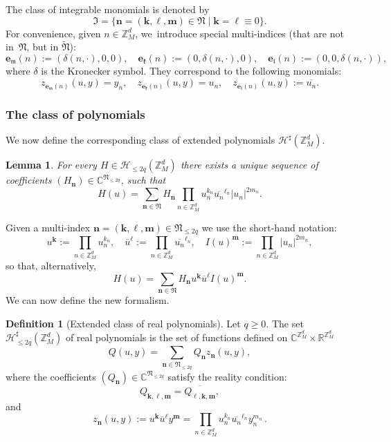 \documentclass[JEP,XML,SOM,Unicode,published]{cedram}
\theoremstyle{plain}
\newtheorem{lemma}[theorem]{Lemma}
\theoremstyle{definition}
\newtheorem{definition}[theorem]{Definition}
\newcommand{\nb}{{\boldsymbol n}}
\newcommand{\kb}{{\boldsymbol k}}
\newcommand{\lb}{{\boldsymbol \ell}}
\newcommand{\mb}{{\boldsymbol m}}
\newcommand{\Nb}{{\boldsymbol{\mathfrak{N}}}}
\newcommand{\Z}{\mathbb{Z}}
\newcommand{\R}{\mathbb{R}}
\newcommand{\C}{\mathbb{C}}
\newcommand{\1}{\mathbf{1}}
\begin{document}
The class of integrable monomials is denoted by
\begin{equation}
\label{eq:I}
\mathfrak{I} = \{\nb=(\kb,\lb,\mb)\in\Nb\mid \kb=\lb\equiv0\}.
\end{equation}
For convenience, given $n\in\Z_{M}^{d}$, we~introduce special multi-indices (that are not in~$\Nb$, but in $\widetilde{\Nb}$):
\[
\boldsymbol{e}_{\mathfrak{m}}(n) := (\delta(n,\cdot),0,0),\quad \boldsymbol{e}_{\mathfrak{k}}(n):=(0,\delta(n, \cdot),0),\quad \boldsymbol{e}_{\mathfrak{l}}(n) := (0,0,\delta(n,\cdot)),
\]
where $\delta$ is the Kronecker symbol. They correspond to the following monomials:
\[
z_{\boldsymbol{e}_{\mathfrak{m}}(n)}(u,y) = y_{n},
\quad z_{\boldsymbol{e}_{\mathfrak{k}}(n)}(u,y) = u_{n},
\quad z_{\boldsymbol{e}_{\mathfrak{l}}(n)}(u,y) := \overline{u_{n}}.
\]

\subsubsection{The class of polynomials} We now define the corresponding class of extended polynomials $\mathcal{H}^{\sharp}(\Z_{M}^{d})$.

\begin{lemma} \label{lem:pouette}
For every $H\in\mathcal{H}_{\leq 2q}(\Z_{M}^{d})$ there exists a unique sequence of coefficients $(H_{\nb})\in\C^{\Nb_{\leq2q}}$, such that
\[
H(u) = \sum_{\nb\in\Nb} H_{\nb}
\prod_{n\in\Z_{M}^{d}}
u_{n}^{k_{n}}\overline{u_{n}}^{\ell_{n}}|u_{n}|^{2m_{n}}.
\]
\end{lemma}
Given a multi-index $\nb=(\kb,\lb,\mb)\in\Nb_{\leq2q}$ we use the short-hand notation:
\[
u^{\kb}
:= \prod_{n\in\Z_{M}^{d}}u_{n}^{k_{n}},
\quad
\overline{u}^{\lb}
:= \prod_{n\in\Z_{M}^{d}}\overline{u_{n}}^{\ell_{n}},\quad
I(u)^{\mb}
:= \prod_{n\in\Z_{M}^{d}}|u_{n}|^{2m_{n}},
\]
so that, alternatively,
\[
H(u) = \sum_{\nb\in\Nb} H_{\nb}u^{\kb}\overline{u}^{\lb}I(u)^{\mb}.
\]
We can now define the new formalism.
\begin{definition}[Extended class of real polynomials]
\label{def:ext} Let $q\geq0$. The set $\mathcal{H}^{\sharp}_{\leq2q}(\Z_{M}^{d})$ of real polynomials is the set of functions defined on $\C^{\Z_{M}^{d}}\times\R^{\Z_{M}^{d}}$
\[
Q(u,y) = \sum_{\nb\in\Nb_{\leq2q}} Q_{\nb}z_{\nb}(u,y),
\]
where the coefficients $(Q_{\nb})\in\C^{\Nb_{\leq2q}}$ satisfy the reality condition:
\[
Q_{\kb,\lb,\mb}= \overline{Q_{\lb,\kb,\mb}},
\]
and
\[
z_{\nb}(u,y) := u^{\kb}\overline{u}^{\lb}y^{\mb} = \prod_{n\in\Z_{M}^{d}}u_n^{k_n}\overline{u_{n}}^{\ell_n}y_n^{m_n}\,.
\]
\end{definition}
\end{document}
